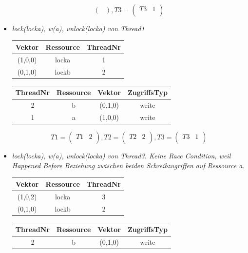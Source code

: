 \documentclass[10pt,a4paper]{article}
\begin{document}
\begin{itemize}
\[\begin{pmatrix}
	\end{pmatrix}
	, T3 = \begin{pmatrix}
		T3 & 1\\
	\end{pmatrix}
\]
\item \textit{lock(locka), w(a), unlock(locka) von Thread1}\\[0.3cm]
\begin{tabular}{ >{\small}c >{\small}c >{\small}c }
  	Vektor & Ressource & ThreadNr \\\hline
  	(1,0,0) & locka & 1 \\
  	(0,1,0) & lockb & 2 \\\hline
\end{tabular}\hspace*{0.5cm}
\begin{tabular}{ >{\small}c >{\small}c >{\small}c >{\small}c }
  	ThreadNr & Ressource & Vektor & ZugriffsTyp \\\hline
  	2 & b & (0,1,0) & write \\
  	1 & a & (1,0,0) & write \\\hline
\end{tabular}
\[
	T1 = \begin{pmatrix}
		T1 & 2\\
	\end{pmatrix}
	, T2 = \begin{pmatrix}
		T2 & 2\\
	\end{pmatrix}
	, T3 = \begin{pmatrix}
		T3 & 1\\
	\end{pmatrix}
\]\newpage
\item \textit{lock(locka), w(a), unlock(locka) von Thread3. Keine Race Condition, weil Happened Before Beziehung zwischen beiden Schreibzugriffen auf Ressource a.}\\[0.3cm]
\begin{tabular}{ >{\small}c >{\small}c >{\small}c }
  	Vektor & Ressource & ThreadNr \\\hline
  	(1,0,2) & locka & 3 \\
  	(0,1,0) & lockb & 2 \\\hline
\end{tabular}\hspace*{0.5cm}
\begin{tabular}{ >{\small}c >{\small}c >{\small}c >{\small}c }
  	ThreadNr & Ressource & Vektor & ZugriffsTyp \\\hline
  	2 & b & (0,1,0) & write \\

\end{tabular}
\end{itemize}
\end{document}
